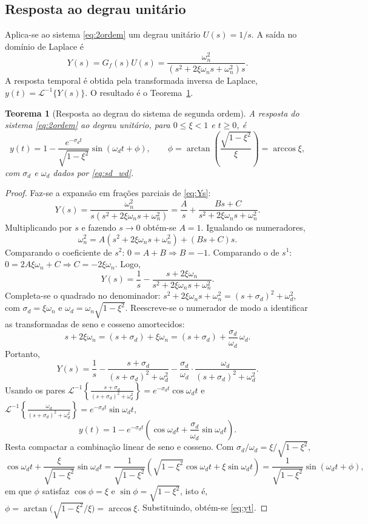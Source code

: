 \documentclass[11pt,a4paper,oneside]{book}
\theoremstyle{definition}
\theoremstyle{plain}
\newtheorem{teorema}{Teorema}[chapter]
\newcommand{\Ltr}{\mathcal{L}}
\newcommand{\wn}{\omega_n}
\newcommand{\wda}{\omega_d}
\newcommand{\sd}{\sigma_d}
\begin{document}
\subsection{Resposta ao degrau unitário}

Aplica-se ao sistema \eqref{eq:2ordem} um degrau unitário $U(s)=1/s$. A saída no
domínio de Laplace é
\begin{equation}
    Y(s)=G_f(s)U(s)=\frac{\wn^2}{\left(s^2+2\xi\wn s+\wn^2\right)s}.
    \label{eq:Ys}
\end{equation}
A resposta temporal é obtida pela transformada inversa de Laplace,
$y(t)=\Ltr^{-1}\{Y(s)\}$. O resultado é o Teorema~\ref{teo:resposta_degrau}.

\begin{teorema}[Resposta ao degrau do sistema de segunda ordem]
\label{teo:resposta_degrau}
A resposta do sistema \eqref{eq:2ordem} ao degrau unitário, para $0\le\xi<1$ e
$t\ge 0$, é
\begin{equation}
    y(t)=1-\frac{e^{-\sd t}}{\sqrt{1-\xi^2}}
        \sin\!\left(\wda t+\phi\right),
    \qquad \phi=\arctan\!\left(\frac{\sqrt{1-\xi^2}}{\xi}\right)=\arccos\xi,
    \label{eq:yt}
\end{equation}
com $\sd$ e $\wda$ dados por \eqref{eq:sd_wd}.
\end{teorema}

\begin{proof}
Faz-se a expansão em frações parciais de \eqref{eq:Ys}:
\[
Y(s)=\frac{\wn^2}{s\left(s^2+2\xi\wn s+\wn^2\right)}
    =\frac{A}{s}+\frac{Bs+C}{s^2+2\xi\wn s+\wn^2}.
\]
Multiplicando por $s$ e fazendo $s\to 0$ obtém-se $A=1$. Igualando os numeradores,
\[
\wn^2=A\left(s^2+2\xi\wn s+\wn^2\right)+(Bs+C)s.
\]
Comparando o coeficiente de $s^2$: $0=A+B\Rightarrow B=-1$. Comparando o de $s^1$:
$0=2A\xi\wn+C\Rightarrow C=-2\xi\wn$. Logo,
\[
Y(s)=\frac{1}{s}-\frac{s+2\xi\wn}{s^2+2\xi\wn s+\wn^2}.
\]
Completa-se o quadrado no denominador: $s^2+2\xi\wn s+\wn^2=(s+\sd)^2+\wda^2$,
com $\sd=\xi\wn$ e $\wda=\wn\sqrt{1-\xi^2}$. Reescreve-se o numerador de modo a
identificar as transformadas de seno e cosseno amortecidos:
\[
s+2\xi\wn=(s+\sd)+\xi\wn=(s+\sd)+\frac{\sd}{\wda}\,\wda .
\]
Portanto,
\[
Y(s)=\frac{1}{s}
     -\frac{s+\sd}{(s+\sd)^2+\wda^2}
     -\frac{\sd}{\wda}\cdot\frac{\wda}{(s+\sd)^2+\wda^2}.
\]
Usando os pares $\Ltr^{-1}\!\left\{\tfrac{s+\sd}{(s+\sd)^2+\wda^2}\right\}
=e^{-\sd t}\cos\wda t$ e
$\Ltr^{-1}\!\left\{\tfrac{\wda}{(s+\sd)^2+\wda^2}\right\}=e^{-\sd t}\sin\wda t$,
\[
y(t)=1-e^{-\sd t}\left(\cos\wda t+\frac{\sd}{\wda}\sin\wda t\right).
\]
Resta compactar a combinação linear de seno e cosseno. Com
$\sd/\wda=\xi/\sqrt{1-\xi^2}$,
\[
\cos\wda t+\frac{\xi}{\sqrt{1-\xi^2}}\sin\wda t
=\frac{1}{\sqrt{1-\xi^2}}\left(\sqrt{1-\xi^2}\cos\wda t+\xi\sin\wda t\right)
=\frac{1}{\sqrt{1-\xi^2}}\sin(\wda t+\phi),
\]
em que $\phi$ satisfaz $\cos\phi=\xi$ e $\sin\phi=\sqrt{1-\xi^2}$, isto é,
$\phi=\arctan\!\big(\sqrt{1-\xi^2}/\xi\big)=\arccos\xi$. Substituindo, obtém-se
\eqref{eq:yt}.
\end{proof}
\end{document}
